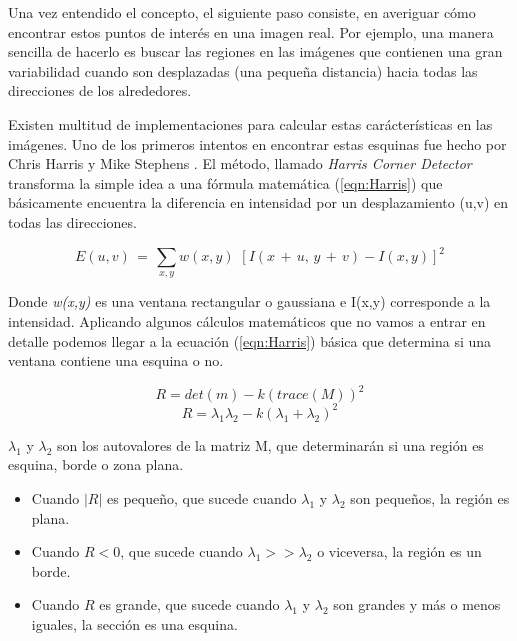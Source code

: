 Una vez entendido el concepto, el siguiente paso consiste, en averiguar cómo encontrar estos puntos de interés en una imagen real. Por ejemplo, una manera sencilla de hacerlo es buscar las regiones en las imágenes que contienen una gran variabilidad cuando son desplazadas (una pequeña distancia) hacia todas las direcciones de los alrededores.

Existen multitud de implementaciones para calcular estas carácterísticas en las imágenes. Uno de los primeros intentos en encontrar estas esquinas fue hecho por Chris Harris y Mike Stephens \parencite{Reference8}. El método, llamado \textit{Harris Corner Detector} transforma la simple idea a una fórmula matemática (\ref{eqn:Harris}) que básicamente encuentra la diferencia en intensidad por un desplazamiento (u,v) en todas las direcciones.

\begin{equation}
E(u,v)\,=\,\sum_{x,y}w(x,y)\,\,[I(x\,+\, u,\, y\,+\, v)-I(x,y)]^{2}
\label{eqn:Harris}
\end{equation}

Donde \textit{w(x,y)} es una ventana rectangular o gaussiana e I(x,y) corresponde a la intensidad. Aplicando algunos cálculos matemáticos que no vamos a entrar en detalle podemos llegar a la ecuación (\ref{eqn:Harris}) básica que determina si una ventana contiene una esquina o no.

\[ R=det(m)-k(trace(M))^{2} \]
\begin{equation}
R=\lambda_{1}\lambda_{2}-k(\lambda_{1}+\lambda_{2})^{2}
\label{eqn:Harris2}
\end{equation}

$\lambda_{1}$ y $\lambda_{2}$ son los autovalores de la matriz M, que determinarán si una región es esquina, borde o zona plana.

\begin{itemize}
\item Cuando $|R|$ es pequeño, que sucede cuando $\lambda_{1}$ y $\lambda_{2}$ son pequeños, la región es plana.

\item Cuando $R < 0$, que sucede cuando $\lambda_{1} >> \lambda_{2}$ o viceversa, la región es un borde.

\item Cuando $R$ es grande, que sucede cuando $\lambda_{1}$ y $\lambda_{2}$ son grandes y más o menos iguales, la sección es una esquina.

\end{itemize}

